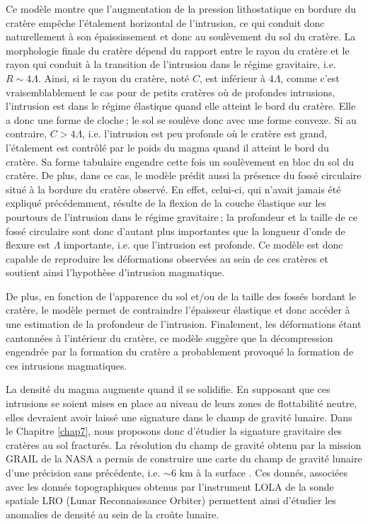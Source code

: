 Ce modèle  montre que l’augmentation  de la pression  lithostatique en
bordure du  cratère empêche l’étalement horizontal  de l’intrusion, ce
qui  conduit  donc  naturellement  à son  épaississement  et  donc  au
soulèvement du sol du cratère. La morphologie finale du cratère dépend
du rapport  entre le  rayon du cratère  et le rayon  qui conduit  à la
transition   de   l’intrusion   dans  le   régime   gravitaire,   i.e.
$R\sim  4\Lambda$.  Ainsi,  si  le  rayon du  cratère,  noté $C$,  est
inférieur à $4\Lambda$,  comme c’est vraisemblablement le  cas pour de
petits cratères  où de profondes  intrusions, l’intrusion est  dans le
régime élastique  quand elle atteint le  bord du cratère. Elle  a donc
une forme de  cloche ; le sol se soulève donc  avec une forme convexe.
Si au contraire, $C>4\Lambda$, i.e. l’intrusion est peu profonde où le
cratère  est grand,  l’étalement est  contrôlé par  le poids  du magma
quand il atteint le bord du cratère. Sa forme tabulaire engendre cette
fois un soulèvement en  bloc du sol du cratère. De  plus, dans ce cas,
le modèle  prédit aussi  la présence  du fossé  circulaire situé  à la
bordure du cratère observé. En effet, celui-ci, qui n’avait jamais été
expliqué précédemment,  résulte de la  flexion de la  couche élastique
sur  les  pourtours de  l’intrusion  dans  le régime  gravitaire ;  la
profondeur et la taille de ce fossé circulaire sont donc d’autant plus
importantes  que   la  longueur   d’onde  de  flexure   est  $\Lambda$
importante,  i.e. que  l’intrusion est  profonde. Ce  modèle est  donc
capable  de  reproduire les  déformations  observées  au sein  de  ces
cratères et soutient ainsi l’hypothèse d’intrusion magmatique.

De plus,  en fonction  de l’apparence  du sol et/ou  de la  taille des
fossés bordant le cratère, le modèle permet de contraindre l’épaisseur
élastique  et  donc accéder  à  une  estimation  de la  profondeur  de
l’intrusion.    Finalement,  les   déformations  étant   cantonnées  à
l’intérieur  du  cratère,  ce  modèle  suggère  que  la  décompression
engendrée  par la  formation  du cratère  a  probablement provoqué  la
formation de ces intrusions magmatiques.

La densité du magma augmente quand  il se solidifie.  En supposant que
ces intrusions  se soient mises en  place au niveau de  leurs zones de
flottabilité neutre,  elles devraient avoir laissé  une signature dans
le  champ de  gravité  lunaire.  Dans  le  Chapitre \ref{chap7},  nous
proposons donc d’étudier  la signature gravitaire des  cratères au sol
fracturés. La  résolution du  champ de gravité  obtenu par  la mission
GRAIL de la NASA a permis de  construire une carte du champ de gravité
lunaire d’une précision sans précédente, i.e. $\sim 6$ km à la surface
\citep{Zuber:2013cp}.    Ces  donnés,   associées   avec  les   donnés
topographiques obtenus par l’instrument LOLA  de la sonde spatiale LRO
(Lunar   Reconnaissance  Orbiter)   permettent  ainsi   d’étudier  les
anomalies de densité au sein de la croûte lunaire.

